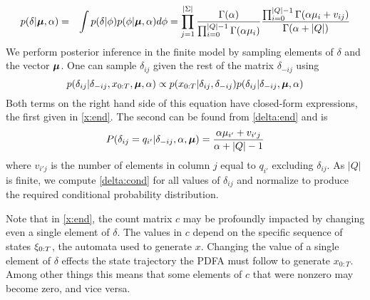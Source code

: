  \begin{eqnarray}
 p(\delta|\bmu,\alpha) & = & \int p(\delta|\phi)p(\phi|\bmu,\alpha) d\phi %
   =   \prod_{j=1}^{|\Sigma|} \frac{\Gamma(\alpha)}{\prod_{i=0}^{|Q|-1}\Gamma(\alpha\mu_i)} \frac{\prod_{i=0}^{|Q|-1} \Gamma(\alpha\mu_i + v_{ij})}{\Gamma(\alpha + |Q|)} \label{delta:end}
  \end{eqnarray}
%
% 
We perform posterior inference in the finite model by sampling elements of $\delta$ and the vector $\bmu$.  %
One can sample $\delta_{ij}$ given the rest of the matrix $\delta_{-ij}$ using 
%
\begin{equation}
p(\delta_{ij}|\delta_{-ij},x_{0:T},\bmu,\alpha) \propto p(x_{0:T}|\delta_{ij},\delta_{-ij})p(\delta_{ij}|\delta_{-ij},\bmu,\alpha) \label{delta:cond}
\end{equation}
%
Both terms on the right hand side of this equation have closed-form expressions, the first given in \eqref{x:end}.  The second can be found from \eqref{delta:end} and is
%
\begin{equation}
P(\delta_{ij} = q_{i'}|\delta_{-ij},\alpha,\bmu) = \frac{\alpha\mu_{i'} + v_{i'j}}{\alpha + |Q| - 1} \label{delta:pred}
\end{equation}
%
where $v_{i'j}$ is the number of elements in column $j$ equal to $q_{i'}$  excluding $\delta_{ij}$.  As $|Q|$ is finite, we compute \eqref{delta:cond} for all values of $\delta_{ij}$ and normalize to produce the required conditional probability distribution.

Note that in \eqref{x:end}, the count matrix $c$ may be profoundly impacted by changing even a single element of $\delta$.  The values in $c$ depend on the specific sequence of states  $\q_{0:T}$, the automata used to generate $x$.  Changing the value of a single element of $\delta$ effects the state trajectory the PDFA must follow to generate $x_{0:T}$.  %
 Among other things this means that some elements of $c$ that were nonzero may become zero, and vice versa.

